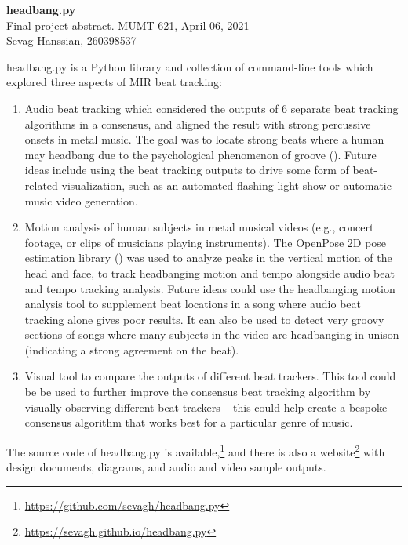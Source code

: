 \documentclass[letter,12pt]{report}
\begin{document}
\noindent\Large{\textbf{headbang.py}}\\
\large{Final project abstract. MUMT 621, April 06, 2021}\\
\large{Sevag Hanssian, 260398537}

\noindent\hrulefill

\vspace{2em}

headbang.py is a Python library and collection of command-line tools which explored three aspects of MIR beat tracking:

\begin{enumerate}
	\item
		Audio beat tracking which considered the outputs of 6 separate beat tracking algorithms in a consensus, and aligned the result with strong percussive onsets in metal music. The goal was to locate strong beats where a human may headbang due to the psychological phenomenon of groove (\cite{groove}). Future ideas include using the beat tracking outputs to drive some form of beat-related visualization, such as an automated flashing light show or automatic music video generation.
	\item
		Motion analysis of human subjects in metal musical videos (e.g., concert footage, or clips of musicians playing instruments). The OpenPose 2D pose estimation library (\cite{openpose}) was used to analyze peaks in the vertical motion of the head and face, to track headbanging motion and tempo alongside audio beat and tempo tracking analysis. Future ideas could use the headbanging motion analysis tool to supplement beat locations in a song where audio beat tracking alone gives poor results. It can also be used to detect very groovy sections of songs where many subjects in the video are headbanging in unison (indicating a strong agreement on the beat).
	\item
		Visual tool to compare the outputs of different beat trackers. This tool could be be used to further improve the consensus beat tracking algorithm by visually observing different beat trackers -- this could help create a bespoke consensus algorithm that works best for a particular genre of music.
\end{enumerate}

The source code of headbang.py is available,\footnote{\url{https://github.com/sevagh/headbang.py}} and there is also a website\footnote{\url{https://sevagh.github.io/headbang.py}} with design documents, diagrams, and audio and video sample outputs.

\vfill
\clearpage

\nocite{*}
\printbibheading[title={\vspace{-3.5em}References},heading=bibnumbered]
\vspace{-1.5em}
\printbibliography[heading=none]
\end{document}

